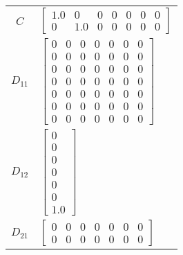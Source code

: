 \begin{tabular}{cl}
   $C$    & $\left[\begin{matrix}1.0 & 0 & 0 & 0 & 0 & 0 & 0\\0 & 1.0 & 0 & 0 & 0 & 0 & 0\end{matrix}\right]$                                                                                                                                                                                                      \\
 $D_{11}$ & $\left[\begin{matrix}0 & 0 & 0 & 0 & 0 & 0 & 0\\0 & 0 & 0 & 0 & 0 & 0 & 0\\0 & 0 & 0 & 0 & 0 & 0 & 0\\0 & 0 & 0 & 0 & 0 & 0 & 0\\0 & 0 & 0 & 0 & 0 & 0 & 0\\0 & 0 & 0 & 0 & 0 & 0 & 0\\0 & 0 & 0 & 0 & 0 & 0 & 0\end{matrix}\right]$                                                                   \\
 $D_{12}$ & $\left[\begin{matrix}0\\0\\0\\0\\0\\0\\1.0\end{matrix}\right]$                                                                                                                                                                                                                                         \\
 $D_{21}$ & $\left[\begin{matrix}0 & 0 & 0 & 0 & 0 & 0 & 0\\0 & 0 & 0 & 0 & 0 & 0 & 0\end{matrix}\right]$                                                                                                                                                                                                          \\
\hline
\end{tabular}